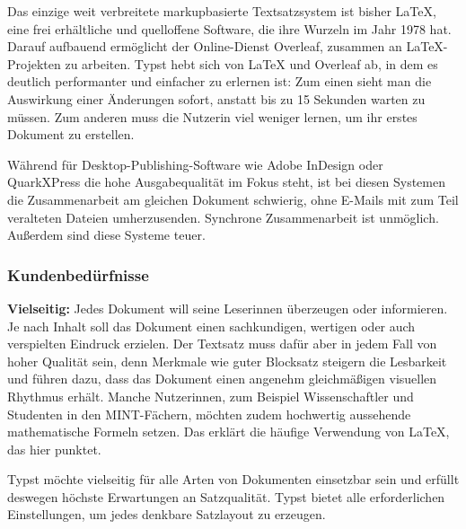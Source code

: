 \documentclass[11pt, a4paper]{article}
\newcommand{\gender}{\raisebox{-.25em}{*}}
\renewcommand{\glossary} {\marginsymbol{$\hookrightarrow$}}
\newcommand{\marginsymbol}[1] {\protect\marginsymbolhelper{#1}}
\newcommand{\marginsymbolhelper}[1] {\tabto*{-1cm}\makebox[0cm]{#1}\tabto*{\TabPrevPos}}
\begin{document}
Das einzige weit verbreitete markupbasierte Textsatzsystem ist bisher LaTeX, eine frei erhältliche und quelloffene Software, die ihre Wurzeln im Jahr 1978 hat. Darauf aufbauend ermöglicht der Online-Dienst Overleaf, zusammen an LaTeX-Projekten zu arbeiten. Typst hebt sich von LaTeX und Overleaf ab, in dem es deutlich performanter und einfacher zu erlernen ist: Zum einen sieht man die Auswirkung einer Änderungen sofort, anstatt bis zu 15 Sekunden warten zu müssen. Zum anderen muss die\gender{} Nutzer\gender{}in viel weniger lernen, um ihr\gender{} erstes Dokument zu erstellen.

Während für Desktop-Publishing-Software wie Adobe InDesign oder QuarkXPress die hohe Ausgabequalität im Fokus steht, ist bei diesen Systemen die Zusammenarbeit am gleichen Dokument schwierig, ohne E-Mails mit zum Teil veralteten Dateien umherzusenden. Synchrone Zusammenarbeit ist unmöglich. Außerdem sind diese Systeme teuer.

\subsubsection*{Kundenbedürfnisse}


\textbf{Vielseitig:} Jedes Dokument will seine Leser\gender{}innen überzeugen oder informieren. Je nach Inhalt soll das Dokument einen sachkundigen, wertigen oder auch verspielten Eindruck erzielen. Der Textsatz muss dafür aber in jedem Fall von hoher Qualität sein, denn Merkmale wie guter \glossary Blocksatz steigern die Lesbarkeit und führen dazu, dass das Dokument einen angenehm gleichmäßigen visuellen Rhythmus erhält. Manche Nutzer\gender{}innen, zum Beispiel Wissenschaftler und Studenten in den \glossary MINT-Fächern, möchten zudem hochwertig aussehende mathematische Formeln setzen. Das erklärt die häufige Verwendung von LaTeX, das hier punktet.

Typst möchte vielseitig für alle Arten von Dokumenten einsetzbar sein und erfüllt deswegen höchste Erwartungen an Satzqualität. Typst bietet alle erforderlichen Einstellungen, um jedes denkbare Satzlayout zu erzeugen.
\end{document}
